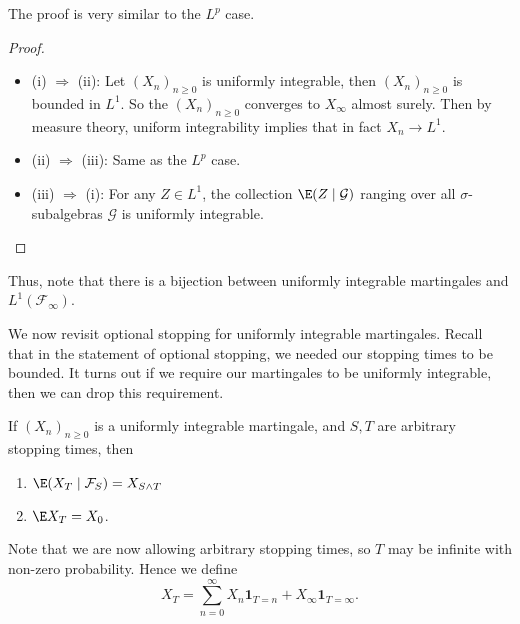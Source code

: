 \documentclass[a4paper]{article}
\begin{document}
The proof is very similar to the $L^p$ case.
\begin{proof}\leavevmode
  \begin{itemize}
    \item (i) $\Rightarrow$ (ii): Let $(X_n)_{n \geq 0}$ is uniformly integrable, then $(X_n)_{n \geq 0}$ is bounded in $L^1$. So the $(X_n)_{n \geq 0}$ converges to $X_\infty$ almost surely. Then by measure theory, uniform integrability implies that in fact $X_n \to L^1$.
    \item (ii) $\Rightarrow$ (iii): Same as the $L^p$ case.
    \item (iii) $\Rightarrow$ (i): For any $Z \in L^1$, the collection $\E(Z \mid \mathcal{G})$ ranging over all $\sigma$-subalgebras $\mathcal{G}$ is uniformly integrable.
  \end{itemize}
\end{proof}
Thus, note that there is a bijection between uniformly integrable martingales and $L^1(\mathcal{F}_\infty)$.

We now revisit optional stopping for uniformly integrable martingales. Recall that in the statement of optional stopping, we needed our stopping times to be bounded. It turns out if we require our martingales to be uniformly integrable, then we can drop this requirement.

\begin{thm}
  If $(X_n)_{n \geq 0}$ is a uniformly integrable martingale, and $S, T$ are arbitrary stopping times, then
  \begin{enumerate}
    \item $\E(X_T \mid \mathcal{F}_S) = X_{S \wedge T}$
    \item $\E X_T = X_0$.
  \end{enumerate}
\end{thm}
Note that we are now allowing arbitrary stopping times, so $T$ may be infinite with non-zero probability. Hence we define
\[
  X_T = \sum_{n = 0}^\infty X_n \mathbf{1}_{T = n} + X_\infty \mathbf{1}_{T = \infty}.
\]
\end{document}
